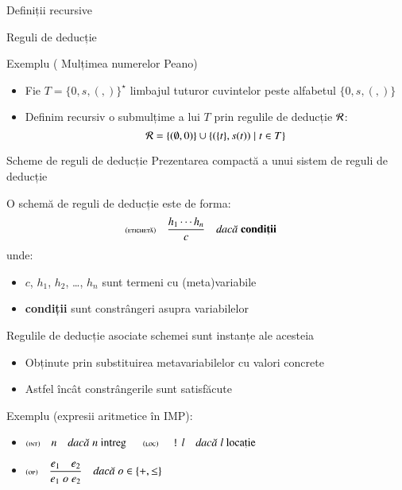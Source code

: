 \documentclass[xcolor=pdftex,romanian,colorlinks]{beamer}
\begin{document}
\begin{section}{Definiții recursive}
\begin{frame}{Reguli de deducție}
  \begin{block}{Exemplu ( Mulțimea numerelor Peano)}
\begin{itemize}
\item Fie $T = \{0,s,(,)\}^\star$ limbajul tuturor cuvintelor peste alfabetul $\{0, s,(,)\}$
\item Definim recursiv o submulțime a lui $T$ prin regulile de deducție $\cal R$:
\[{\cal R} = \{(\emptyset,0)\} \cup \{(\{t\},s(t)) \mid t\in T\} \]
\end{itemize}
  \end{block}
\end{frame}

\begin{frame}{Scheme de reguli de deducție}
 Prezentarea compactă a unui sistem de reguli de deducție

O schemă de reguli de deducție este de forma:
\[\displaystyle\reg[etichetă]{c}{h_1 \cdots h_n}{\mbox{\bf condiții}}\]
unde:
\begin{itemize}
\item $c$, $h_1$, $h_2$, \ldots, $h_n$ sunt termeni cu (meta)variabile
\item {\bf condiții} sunt constrângeri asupra variabilelor 
\end{itemize}

Regulile de deducție asociate schemei sunt  instanțe ale acesteia
\begin{itemize}
\item Obținute prin substituirea metavariabilelor cu valori concrete
\item Astfel încât constrângerile sunt satisfăcute
\end{itemize}

   \begin{block}{Exemplu (expresii aritmetice în IMP):} 
\begin{itemize}
\item[]
               \hfill $\displaystyle\reg[int]{n}{}{n \mbox{ intreg}}$  \hfill $\displaystyle\reg[loc]{\terminal{!}l}{}{l\mbox{ locație}}$\hfill\ 
  

\item[]               \hfill $\displaystyle\reg[op]{e_1 \mathrel{o} e_2}{e_1\si  e_2}{o \in \{+,\leq\}}$\hfill\;
\end{itemize}
       \end{block}
\end{frame}


\end{section}
\end{document}
